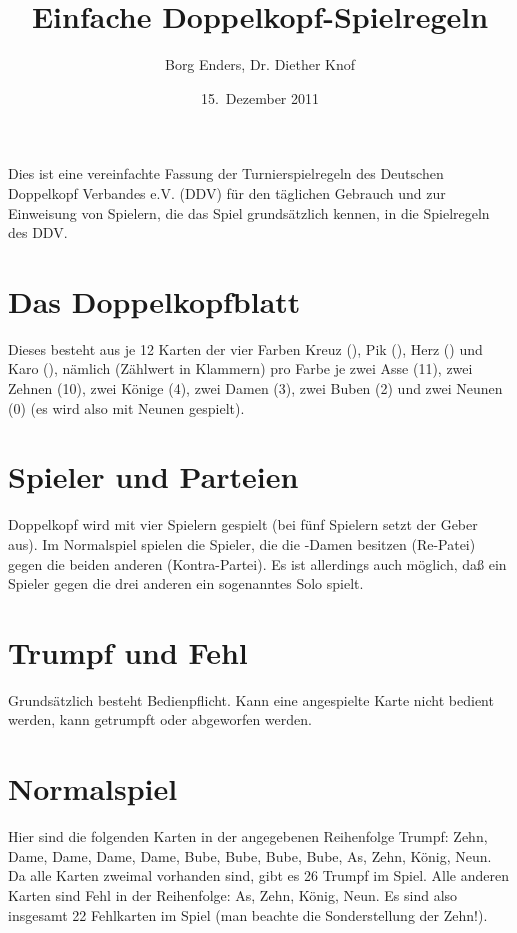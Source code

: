 \documentclass[12pt]{scrartcl}
\title{Einfache Doppelkopf-Spielregeln}
\author{Borg Enders, Dr. Diether Knof}
\date{15.~Dezember 2011}
\begin{document}
\maketitle

\noindent
Dies ist eine vereinfachte Fassung der Turnierspielregeln des Deutschen Doppelkopf Verbandes e.V. (DDV) für den täglichen Gebrauch und zur Einweisung von Spielern, die das Spiel grundsätzlich kennen, in die Spielregeln des DDV.

\tableofcontents

\section{Das Doppelkopfblatt}
Dieses besteht aus je 12 Karten der vier Farben Kreuz (\kreuz), Pik (\pik), Herz (\herz) und Karo (\karo), nämlich (Zählwert in Klammern) pro Farbe je zwei Asse (11), zwei Zehnen (10), zwei Könige (4), zwei Damen (3), zwei
Buben (2) und zwei Neunen (0) (es wird also mit Neunen gespielt).

\section{Spieler und Parteien}
Doppelkopf wird mit vier Spielern gespielt (bei fünf Spielern setzt der Geber aus). Im Normalspiel spielen die Spieler, die die \kreuz-Damen besitzen (Re-Patei) gegen die beiden anderen (Kontra-Partei). Es ist allerdings auch möglich, daß ein Spieler gegen die drei anderen ein sogenanntes Solo spielt.

\section{Trumpf und Fehl}
Grundsätzlich besteht Bedienpflicht. Kann eine angespielte Karte nicht bedient werden, kann getrumpft oder abgeworfen werden.

\section{Normalspiel}
Hier sind die folgenden Karten in der angegebenen Reihenfolge Trumpf: \herz Zehn, \kreuz Dame, \pik Dame, \herz Dame, \karo Dame, \kreuz Bube, \pik Bube, \herz Bube, \karo Bube, \karo As, \karo Zehn, \karo König, \karo Neun. Da alle Karten zweimal vorhanden sind, gibt es 26 Trumpf im Spiel. Alle anderen Karten sind Fehl in der Reihenfolge: As, Zehn, König, Neun. Es sind also insgesamt 22 Fehlkarten im Spiel (man beachte die Sonderstellung der \herz Zehn!).
\end{document}
